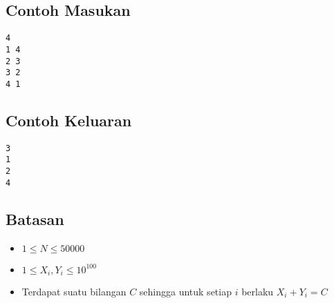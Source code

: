 \documentclass{article}
\begin{document}
\subsection*{Contoh Masukan}

\begin{lstlisting}
4
1 4
2 3
3 2
4 1
\end{lstlisting}

\subsection*{Contoh Keluaran}

\begin{lstlisting}
3
1
2
4
\end{lstlisting}

\subsection*{Batasan}

\begin{itemize}
	\item $1 \leq N \leq 50000$
	\item $1 \leq X_i, Y_i \leq 10^{100}$
	\item Terdapat suatu bilangan $C$ sehingga untuk setiap $i$ berlaku $X_i + Y_i = C$
\end{itemize}
\end{document}
